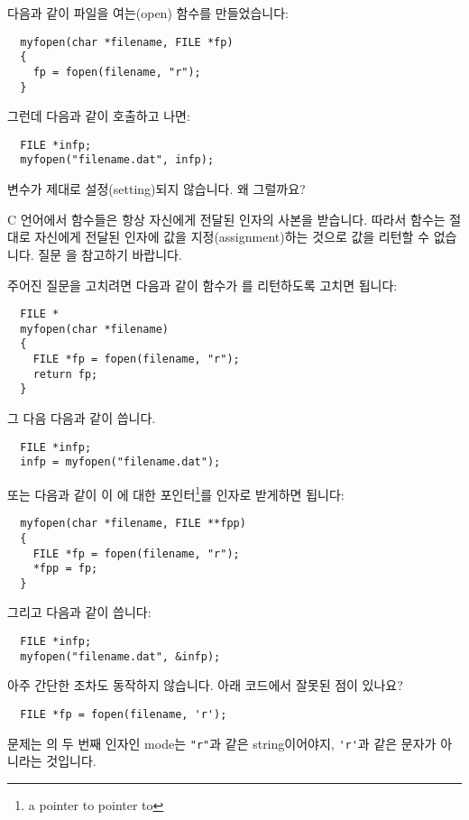\begin{faq}
	다음과 같이 파일을 여는(open) 함수를 만들었습니다:
\begin{verbatim}
  myfopen(char *filename, FILE *fp)
  {
    fp = fopen(filename, "r");
  }
\end{verbatim}

	그런데 다음과 같이 호출하고 나면:

\begin{verbatim}
  FILE *infp;
  myfopen("filename.dat", infp);
\end{verbatim}

	 변수가 제대로 설정(setting)되지 않습니다. 왜 그럴까요?

\A
	C 언어에서 함수들은 항상 자신에게 전달된 인자의 사본을
	받습니다. 따라서 함수는 절대로 자신에게 전달된 인자에 값을
	지정(assignment)하는 것으로 값을 리턴할 수 없습니다.
	질문 을 참고하기 바랍니다.

	주어진 질문을 고치려면 다음과 같이  함수가
	를 리턴하도록 고치면 됩니다:

\begin{verbatim}
  FILE *
  myfopen(char *filename)
  {
    FILE *fp = fopen(filename, "r");
    return fp;
  }
\end{verbatim}

	그 다음 다음과 같이 씁니다.

\begin{verbatim}
  FILE *infp;
  infp = myfopen("filename.dat");
\end{verbatim}

	또는 다음과 같이 이 에 대한 포인터\footnote{a
	pointer to pointer to }를
	인자로 받게하면 됩니다:

\begin{verbatim}
  myfopen(char *filename, FILE **fpp)
  {
    FILE *fp = fopen(filename, "r");
    *fpp = fp;
  }
\end{verbatim}

	그리고 다음과 같이 씁니다:

\begin{verbatim}
  FILE *infp;
  myfopen("filename.dat", &infp);
\end{verbatim}
\end{faq}

\begin{faq}
	아주 간단한  조차도 동작하지 않습니다.
	아래 코드에서 잘못된 점이 있나요?
\begin{verbatim}
  FILE *fp = fopen(filename, 'r');
\end{verbatim}

\A
	문제는 의 두 번째 인자인 mode는 \verb+"r"+과 같은
	string이어야지, \verb+'r'+과 같은 문자가 아니라는 것입니다.
\end{faq}

